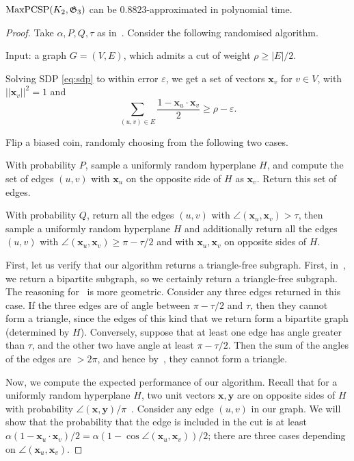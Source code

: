 \documentclass[a4paper,11pt, DIV=11]{scrartcl}
\newcommand{\vx}{\ensuremath{\mathbf{x}}}
\newcommand{\vy}{\ensuremath{\mathbf{y}}}
\renewcommand{\epsilon}{\varepsilon}
\renewcommand{\G}{\ensuremath{\mathfrak{G}}}
\DeclareMathOperator{\maxPCSP}{\textup{MaxPCSP}}
\theoremstyle{plain}
\theoremstyle{definition}
\begin{document}
\begin{theorem}\label{thm:approx}
    $\maxPCSP(K_2, \G_3)$ can be $0.8823$-approximated in polynomial time.
\end{theorem}
\begin{proof}
    Take $\alpha, P, Q, \tau$ as in~. Consider the following randomised algorithm.
    \begin{algoEnum}
        \item Input: a graph $G = (V, E)$, which admits a cut of weight $\rho \geq |E|/2$.
        \item Solving SDP \eqref{eq:sdp} to within error $\epsilon$, we get a set of vectors $\vx_v$ for $v \in V$, with $||\vx_v||^2 = 1$ and 
        \[
        \sum_{(u, v) \in E} \frac{1 - \vx_u \cdot \vx_v}{2} \geq \rho - \epsilon.
        \]
        \item Flip a biased coin, randomly choosing from the following two cases.
        \begin{algoEnum}
        \item\label{case:cut} With probability $P$, sample a uniformly random hyperplane $H$, and compute the set of edges $(u, v)$ with $\vx_u$ on the opposite side of $H$ as $\vx_v$. Return this set of edges.
        \item\label{case:other} With probability $Q$, return all the edges $(u, v)$ with $\angle(\vx_u, \vx_v) > \tau$, then sample a uniformly random hyperplane $H$ and additionally return all the edges $(u, v)$ with $\angle(\vx_u, \vx_v) \geq \pi - \tau / 2$ and with $\vx_u, \vx_v$ on opposite sides of $H$.
        \end{algoEnum}
    \end{algoEnum}
    First, let us verify that our algorithm returns a triangle-free subgraph. First, in~, we return a bipartite subgraph, so we certainly return a triangle-free subgraph. The reasoning for~ is more geometric. Consider any three edges returned in this case. If the three edges are of angle between $\pi - \tau / 2$ and $\tau$, then they cannot form a triangle, since the edges of this kind that we return form a bipartite graph (determined by $H$). Conversely, suppose that at least one edge has angle greater than $\tau$, and the other two have angle at least $\pi - \tau / 2$. Then the sum of the angles of the edges are $> 2\pi$, and hence by~, they cannot form a triangle.

    Now, we compute the expected performance of our algorithm. Recall that for a uniformly random hyperplane $H$, two unit vectors $\vx, \vy$ are on opposite sides of $H$ with probability $\angle(\vx, \vy) / \pi$~\cite{GW95}.
    Consider any edge $(u, v)$ in our graph. We will show that the probability that the edge is included in the cut is at least $\alpha (1 - \vx_u \cdot \vx_v) / 2 = \alpha (1 - \cos \angle(\vx_u, \vx_v))/ 2$; there are three cases depending on $\angle(\vx_u, \vx_v)$.


\end{proof}
\end{document}
